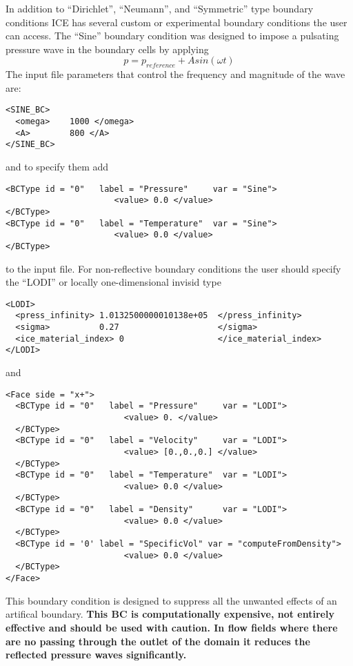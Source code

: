 %
In addition to ``Dirichlet'', ``Neumann'', and ``Symmetric'' type boundary
conditions ICE has several custom or experimental  boundary conditions the user can
access.  The ``Sine'' boundary condition was designed to impose a pulsating
pressure wave in the boundary cells by applying
%
\begin{equation} \label{eq:pSine}
  p = p_{reference} + A  sin(\omega t)
\end{equation}
%
The input file parameters that control the frequency and magnitude of the  wave are: 
\begin{Verbatim}[fontsize=\footnotesize]
<SINE_BC>
  <omega>    1000 </omega>
  <A>        800 </A>
</SINE_BC>
\end{Verbatim}
and to specify them add
\begin{Verbatim}[fontsize=\footnotesize]
<BCType id = "0"   label = "Pressure"     var = "Sine"> 
                      <value> 0.0 </value> 
</BCType> 
<BCType id = "0"   label = "Temperature"  var = "Sine"> 
                      <value> 0.0 </value>
</BCType>
\end{Verbatim}
%
to the input file.
%
For non-reflective boundary conditions the user should specify the ``LODI''
or locally one-dimensional invisid type \cite{ref:Sutherland}

\begin{Verbatim}[fontsize=\footnotesize]
<LODI>
  <press_infinity> 1.0132500000010138e+05  </press_infinity>
  <sigma>          0.27                    </sigma>
  <ice_material_index> 0                   </ice_material_index>
</LODI>
\end{Verbatim}
%
and
%
\begin{Verbatim}[fontsize=\footnotesize]
<Face side = "x+">
  <BCType id = "0"   label = "Pressure"     var = "LODI">
                        <value> 0. </value>                
  </BCType>
  <BCType id = "0"   label = "Velocity"     var = "LODI">
                        <value> [0.,0.,0.] </value>
  </BCType>
  <BCType id = "0"   label = "Temperature"  var = "LODI">
                        <value> 0.0 </value>
  </BCType>
  <BCType id = "0"   label = "Density"      var = "LODI">
                        <value> 0.0 </value>
  </BCType>
  <BCType id = '0' label = "SpecificVol" var = "computeFromDensity">
                        <value> 0.0 </value>
  </BCType>
</Face> 
\end{Verbatim}
%
This boundary condition is designed to suppress all the unwanted effects of an
artifical boundary. \bf This BC is computationally expensive, not entirely
effective and should be used with caution\normalfont.  In flow fields where
there are no passing through the outlet of the domain it reduces
the reflected pressure waves significantly.

